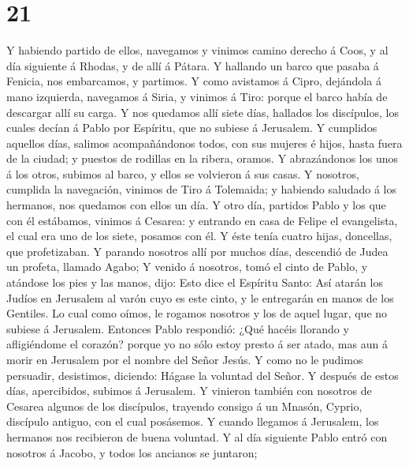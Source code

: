 \hypertarget{section-20}{%
\section{21}\label{section-20}}

 Y habiendo partido de ellos, navegamos y vinimos camino
derecho á Coos, y al día siguiente á Rhodas, y de allí á Pátara.
 Y hallando un barco que pasaba á Fenicia, nos embarcamos,
y partimos.  Y como avistamos á Cipro, dejándola á mano
izquierda, navegamos á Siria, y vinimos á Tiro: porque el barco había de
descargar allí su carga.  Y nos quedamos allí siete días,
hallados los discípulos, los cuales decían á Pablo por Espíritu, que no
subiese á Jerusalem.  Y cumplidos aquellos días, salimos
acompañándonos todos, con sus mujeres é hijos, hasta fuera de la ciudad;
y puestos de rodillas en la ribera, oramos.  Y
abrazándonos los unos á los otros, subimos al barco, y ellos se
volvieron á sus casas.  Y nosotros, cumplida la
navegación, vinimos de Tiro á Tolemaida; y habiendo saludado á los
hermanos, nos quedamos con ellos un día.  Y otro día,
partidos Pablo y los que con él estábamos, vinimos á Cesarea: y entrando
en casa de Felipe el evangelista, el cual era uno de los siete, posamos
con él.  Y éste tenía cuatro hijas, doncellas, que
profetizaban.  Y parando nosotros allí por muchos días,
descendió de Judea un profeta, llamado Agabo;  Y venido á
nosotros, tomó el cinto de Pablo, y atándose los pies y las manos, dijo:
Esto dice el Espíritu Santo: Así atarán los Judíos en Jerusalem al varón
cuyo es este cinto, y le entregarán en manos de los Gentiles.
 Lo cual como oímos, le rogamos nosotros y los de aquel
lugar, que no subiese á Jerusalem.  Entonces Pablo
respondió: ¿Qué hacéis llorando y afligiéndome el corazón? porque yo no
sólo estoy presto á ser atado, mas aun á morir en Jerusalem por el
nombre del Señor Jesús.  Y como no le pudimos persuadir,
desistimos, diciendo: Hágase la voluntad del Señor.  Y
después de estos días, apercibidos, subimos á Jerusalem. 
Y vinieron también con nosotros de Cesarea algunos de los discípulos,
trayendo consigo á un Mnasón, Cyprio, discípulo antiguo, con el cual
posásemos.  Y cuando llegamos á Jerusalem, los hermanos
nos recibieron de buena voluntad.  Y al día siguiente
Pablo entró con nosotros á Jacobo, y todos los ancianos se juntaron;
